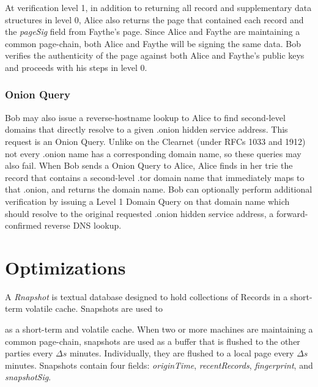 
At verification level 1, in addition to returning all record and supplementary data structures in level 0, Alice also returns the page that contained each record and the \emph{pageSig} field from Faythe's page. Since Alice and Faythe are maintaining a common page-chain, both Alice and Faythe will be signing the same data. Bob verifies the authenticity of the page against both Alice and Faythe's public keys and proceeds with his steps in level 0.


%


\subsubsection{Onion Query}
\label{sec:OnionQuery}

Bob may also issue a reverse-hostname lookup to Alice to find second-level domains that directly resolve to a given .onion hidden service address. This request is an Onion Query. Unlike on the Clearnet (under RFCs 1033 and 1912) not every .onion name has a corresponding domain name, so these queries may also fail. When Bob sends a Onion Query to Alice, Alice finds in her trie the record that contains a second-level .tor domain name that immediately maps to that .onion, and returns the domain name. Bob can optionally perform additional verification by issuing a Level 1 Domain Query on that domain name which should resolve to the original requested .onion hidden service address, a forward-confirmed reverse DNS lookup.







\section{Optimizations}

		A \emph{Rnapshot} is textual database designed to hold collections of Records in a short-term volatile cache. Snapshots are used to 
		
		
		as a short-term and volatile cache. When two or more machines are maintaining a common page-chain, snapshots are used as a buffer that is flushed to the other parties every $ \Delta s $ minutes. Individually, they are flushed to a local page every $ \Delta s $ minutes. Snapshots contain four fields: \emph{originTime}, \emph{recentRecords}, \emph{fingerprint}, and \emph{snapshotSig}.

